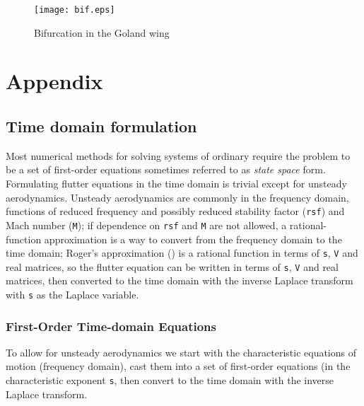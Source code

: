 \documentclass[11pt,openany,twoside]{book}
\numberwithin{equation}{section}		%
\newcommand{\Newterm}[1]{{\em #1}}	%
\newcommand{\Code}[1]{{\small\tt #1}}
\begin{document}
\begin{figure}[h!]
		\texttt{[image: bif.eps]}
	\centering
	\caption{Bifurcation in the Goland wing}\label{fig:bifurcation}
\end{figure}

\newpage
\chapter{Appendix}\label{chap:appendices}

\section{Time domain formulation}\label{sect:timedomain}
Most numerical methods for solving systems of ordinary require the
problem to be a set of first-order equations
sometimes referred to as \Newterm{state space} form.
Formulating flutter equations in the time domain is trivial except for unsteady
aerodynamics. Unsteady aerodynamics are commonly in the frequency domain,
functions of reduced frequency and possibly reduced stability factor (\Code{rsf}) and
Mach number (\Code{M}); if dependence on \Code{rsf} and \Code{M} are not allowed,
a rational-function approximation is a way to convert from the frequency domain to the
time domain; Roger's approximation (\cite{roger1977airplane}) is a rational function
in terms of \Code{s}, \Code{V} and real matrices, so the flutter equation can
be written in terms of \Code{s}, \Code{V} and real matrices, then converted
to the time domain with the inverse Laplace transform with \Code{s} as the Laplace
variable.

\subsection{First-Order Time-domain Equations}\label{sect:statespace}
To allow for unsteady aerodynamics
we start with the characteristic equations of motion
(frequency domain), cast them into a set of first-order equations
(in the characteristic exponent \Code{s}, then convert to the time domain with the inverse
Laplace transform.
\end{document}
